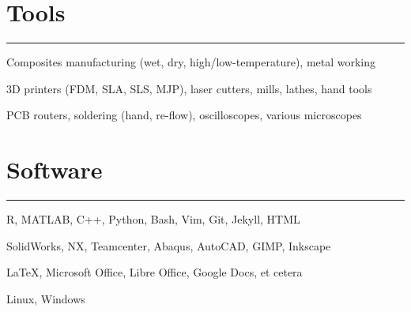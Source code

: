 \vfill
\section{Tools}

\noindent\rule{\textwidth}{\hlinewidth}
    \begin{innerlist}
    \item Composites manufacturing (wet, dry, high/low-temperature), metal working
    \item 3D printers (FDM, SLA, SLS, MJP), laser cutters, mills, lathes, hand tools
    \item PCB routers, soldering (hand, re-flow), oscilloscopes, various microscopes
    \end{innerlist}
\vfill
\section{Software}

\noindent\rule{\textwidth}{\hlinewidth}
    \begin{innerlist}
        \item R, MATLAB, C++, Python, Bash, Vim, Git, Jekyll, HTML
        \item SolidWorks, NX, Teamcenter, Abaqus, AutoCAD, GIMP, Inkscape
        \item \LaTeX, Microsoft Office, Libre Office, Google Docs, et cetera
        \item Linux, Windows
    \end{innerlist}
\vfill
